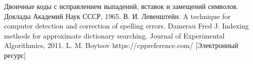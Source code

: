 \documentclass[12pt, a4paper]{report}
\begin{document}
	\begin{thebibliography}{}
	 Двоичные коды с исправлением выпадений, вставок и замещений символов. Доклады Академий Наук СССР, 1965. В. И. Левенштейн.
	 A technique for computer detection and correction of spelling errors. Damerau Fred J.
	 Indexing methods for approximate dictionary searching. Journal of Experimental Algorithmics, 2011. L. M. Boytsov
	 https://cppreference.com/ [Электронный ресурс]
	\end{thebibliography}
\end{document}
